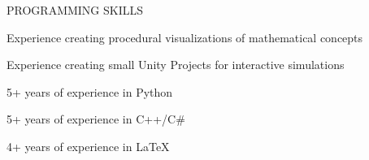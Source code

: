 \documentclass{resume} %
\begin{document}




\begin{rSection}{PROGRAMMING SKILLS} \itemsep -3pt  

\item Experience creating procedural visualizations of mathematical concepts
\item Experience creating small Unity Projects for interactive simulations
\item 5+ years of experience in Python
\item 5+ years of experience in C++/C\#
\item 4+ years of experience in \LaTeX

\end{rSection} 


\end{document}
